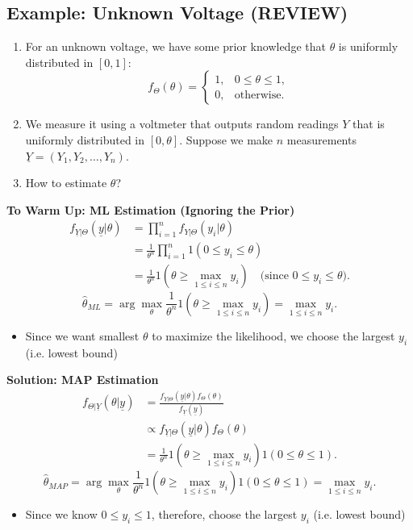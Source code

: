 \subsection{Example: Unknown Voltage (REVIEW)}
\begin{example}
    \begin{enumerate}
        \item For an unknown voltage, we have some prior knowledge that $\theta$ is uniformly distributed in $[0, 1]$:
        \[
        f_\Theta(\theta) =
        \begin{cases}
            1, & 0 \leq \theta \leq 1, \\
            0, & \text{otherwise}.
        \end{cases}
        \]
        \item We measure it using a voltmeter that outputs random readings $Y$ that is uniformly distributed in $[0, \theta]$. Suppose we make $n$ measurements $\underline{Y} = (Y_1, Y_2, \ldots, Y_n)$.
        \item How to estimate $\theta$?
    \end{enumerate}
    \vspace{1em}
    
    \textbf{To Warm Up: ML Estimation (Ignoring the Prior)}
    \begin{align*}
    f_{\underline{Y}|\Theta}(\underline{y}|\theta) &= \prod_{i=1}^n f_{Y|\Theta}(y_i|\theta) \\
    &= \frac{1}{\theta^n} \prod_{i=1}^n 1(0 \leq y_i \leq \theta) \\
    &= \frac{1}{\theta^n} 1(\theta \geq \max_{1 \leq i \leq n} y_i) \quad \text{(since } 0 \leq y_i \leq \theta \text{)}.
    \end{align*}
    \[
    \hat{\theta}_{ML} = \arg\max_{\theta} \frac{1}{\theta^n} 1(\theta \geq \max_{1 \leq i \leq n} y_i) = \max_{1 \leq i \leq n} y_i.
    \]
    \begin{itemize}
        \item Since we want smallest $\theta$ to maximize the likelihood, we choose the largest $y_i$ (i.e. lowest bound)
    \end{itemize}
    
    \textbf{Solution: MAP Estimation}
    \begin{align*}
    f_{\Theta|\underline{Y}}(\theta|\underline{y}) &= \frac{f_{\underline{Y}|\Theta}(\underline{y}|\theta) f_\Theta(\theta)}{f_{\underline{Y}}(\underline{y})} \\
    &\propto f_{\underline{Y}|\Theta}(\underline{y}|\theta) f_\Theta(\theta) \\
    &= \frac{1}{\theta^n} 1(\theta \geq \max_{1 \leq i \leq n} y_i) 1(0 \leq \theta \leq 1).
    \end{align*}
    \[
    \hat{\theta}_{MAP} = \arg\max_{\theta} \frac{1}{\theta^n} 1(\theta \geq \max_{1 \leq i \leq n} y_i) 1(0 \leq \theta \leq 1) = \max_{1 \leq i \leq n} y_i.
    \]
    \begin{itemize}
        \item Since we know $0 \leq y_i \leq 1$, therefore, choose the largest $y_i$ (i.e. lowest bound)
    \end{itemize}
    

\end{example}
